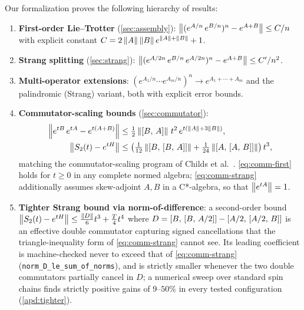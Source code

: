 Our formalization proves the following hierarchy of results:
\begin{enumerate}
  \item \textbf{First-order Lie--Trotter} (\cref{sec:assembly}):
    $\left\|(e^{A/n}\,e^{B/n})^n - e^{A+B}\right\| \le C/n$
    with explicit constant $C = 2\left\|A\right\|\left\|B\right\|e^{\left\|A\right\|+\left\|B\right\|} + 1$.

  \item \textbf{Strang splitting} (\cref{sec:strang}):
    $\left\|(e^{A/2n}\,e^{B/n}\,e^{A/2n})^n - e^{A+B}\right\| \le C'/n^2$.

  \item \textbf{Multi-operator extensions}:
    $(e^{A_1/n} \cdots e^{A_m/n})^n \to e^{A_1+\cdots+A_m}$
    and the palindromic (Strang) variant, both with explicit error bounds.

  \item \textbf{Commutator-scaling bounds} (\cref{sec:commutator}):
    \begin{align}
      \left\|e^{tB}\,e^{tA} - e^{t(A+B)}\right\|
        &\le \tfrac{1}{2}\left\|[B,\,A]\right\|\,t^2\,e^{t(\left\|A\right\|+3\left\|B\right\|)},
        \label{eq:comm-first} \\
      \left\|S_2(t) - e^{tH}\right\|
        &\le \bigl(\tfrac{1}{12}\left\|[B,\,[B,\,A]]\right\|
          + \tfrac{1}{24}\left\|[A,\,[A,\,B]]\right\|\bigr)\,t^3,
        \label{eq:comm-strang}
    \end{align}
    matching the commutator-scaling program of Childs et al.~\cite{childsTheoryTrotterError2021}.
    \eqref{eq:comm-first} holds for $t \ge 0$ in any complete normed algebra;
    \eqref{eq:comm-strang} additionally assumes skew-adjoint
    $A, B$ in a C*-algebra, so that $\left\|e^{tA}\right\| = 1$.

  \item \textbf{Tighter Strang bound via norm-of-difference}: a
    second-order bound
    $\left\|S_2(t)-e^{tH}\right\| \le \tfrac{\left\|D\right\|}{6}t^3 + \tfrac{T}{4}t^4$
    where $D = [B,\,[B,\,A/2]] - [A/2,\,[A/2,\,B]]$ is an
    effective double commutator capturing signed cancellations that the
    triangle-inequality form of \eqref{eq:comm-strang} cannot see. Its
    leading coefficient is machine-checked never to exceed that of
    \eqref{eq:comm-strang} (\texttt{norm\_D\_le\_sum\_of\_norms}), and is
    strictly smaller whenever the two double commutators partially cancel in
    $D$; a numerical sweep over standard spin chains finds strictly positive
    gains of $9$--$50\%$ in every tested configuration (\cref{apd:tighter}).


\end{enumerate}
